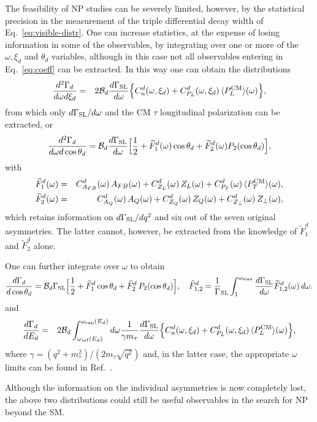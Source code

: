 \documentclass[aps,superscriptaddress,showpacs,nofootinbib,11pt]{revtex4-1}
\newcommand{\bea}{\begin{eqnarray}} \newcommand{\eea}{\end{eqnarray}}
\begin{document}
The feasibility of NP studies can be severely limited, however, by the 
 statistical precision in the measurement of the triple differential decay width of Eq.~\eqref{eq:visible-distr}. One can increase statistics, at the expense of losing information in some of the observables,  by integrating over one or more of the 
$\omega,\xi_d$ and $\theta_d$ variables,  although in this case not 
 all observables entering in Eq.~\eqref{eq:coeff} can be extracted. In this way one can obtain the distributions~\cite{Penalva:2022vxy}
%
\bea
\frac{d^2\Gamma_d}{d\omega  d\xi_d} & = & 2{\cal B}_{d}
\frac{d\Gamma_{\rm SL}}{d\omega}\Big\{  C_n^d(\omega,\xi_d)+C_{P_L}^d(\omega,\xi_d)\,\langle 
P^{\rm CM}_L\rangle(\omega)\Big\},\label{eq:wE}
\eea
%
from which only $d\Gamma_{\rm SL}/d\omega$ and  the CM $\tau$ longitudinal 
polarization can be extracted, or
\bea
\frac{d^2\Gamma_d}{d\omega  d\cos\theta_d}  =  {\cal B}_{d}
\frac{d\Gamma_{\rm SL}}{d\omega} \Big[ 
\frac12+ \widetilde F^d_1(\omega) 
\cos\theta_d +\widetilde  F^d_2(\omega)P_2(\cos\theta_d)\Big],
\label{eq:visible-distr_theta_d}
\eea
%
with
%
\bea
%
\widetilde F^d_1(\omega)&=&C^d_{A_{FB}}(\omega)\,A_{FB}(\omega)+C^d_{Z_L}(\omega)
\,Z_L(\omega)+C^d_{P_T}(\omega)\,\langle P_T^{\rm CM}\rangle(\omega),
\label{eq:F1} \\
\widetilde F^d_2(\omega)&=&C^d_{A_Q}(\omega)\,A_Q(\omega)+C^d_{Z_Q}(\omega)
\,Z_Q(\omega)+C^d_{Z_\perp}(\omega)\,Z_\perp(\omega),\label{eq:F2}
\eea
%
which retains information on $d\Gamma_{\rm SL}/dq^2$ and six out of the seven original asymmetries. The latter cannot, however, be extracted from the knowledge of $\widetilde F^d_1$ and $\widetilde F^d_2$ alone.


One can further integrate over $\omega$ to obtain~\cite{Penalva:2022vxy}
\bea
\frac{d\Gamma_d}{d\cos\theta_d}={\cal B}_d\Gamma_{\rm SL}\Big[
\frac12+\widehat F_1^d\cos\theta_d+\widehat F_2^d\, 
P_2(\cos\theta_d)\Big], \quad  \widehat F_{1,2}^d=\frac1\Gamma_{\rm SL}\int_1^{\omega_{\rm max}}
\frac{d\Gamma_{\rm SL}}{d\omega}\widetilde F_{1,2}^d(\omega)\,d\omega.\label{eq:Gcos}
\eea
and
%
\bea
\frac{d\Gamma_d}{dE_d} & = & 2{\cal B}_{d} \int_{\omega_{\rm inf}(E_d)}^{\omega_{\rm sup}(E_d)} d\omega
\frac{1}{\gamma m_\tau}\frac{d\Gamma_{\rm SL}}{d\omega}\Big\{ 
C_n^d(\omega,\xi_d)+C_{P_L}^d(\omega,\xi_d)\,\langle P^{\rm CM}_L\rangle(\omega)\Big\},
\label{eq:EdG}
\eea
where $\gamma=(q^2+m_\tau^2)/(2m_\tau\sqrt{q^2})$ and,  in the latter case, the appropriate $\omega$ limits can be found in 
Ref.~\cite{Penalva:2022vxy}.

 Although the information on the individual asymmetries is now completely lost,
 the above two distributions could still be useful observables in the search for NP beyond the SM.
\end{document}
